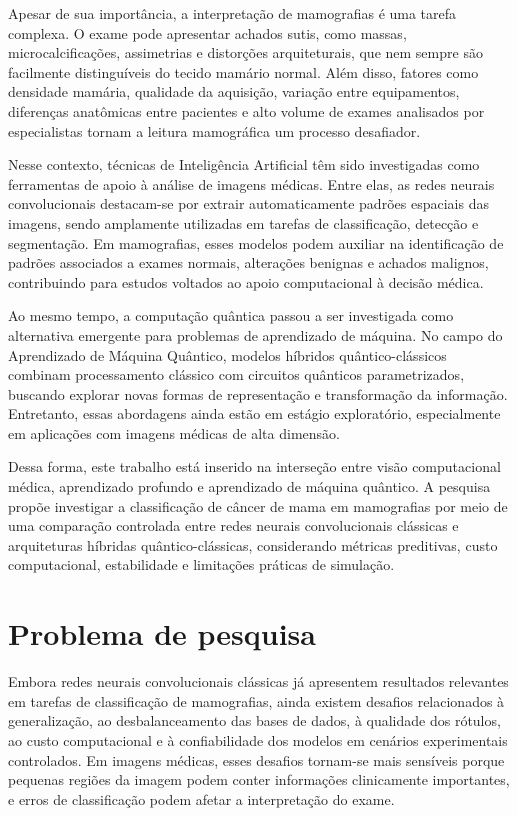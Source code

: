 \documentclass[
    12pt,
    openright,
    oneside,
    a4paper,
    english,
    brazil
]{abntex2}
\begin{document}
Apesar de sua importância, a interpretação de mamografias é uma tarefa complexa. O exame pode apresentar achados sutis, como massas, microcalcificações, assimetrias e distorções arquiteturais, que nem sempre são facilmente distinguíveis do tecido mamário normal. Além disso, fatores como densidade mamária, qualidade da aquisição, variação entre equipamentos, diferenças anatômicas entre pacientes e alto volume de exames analisados por especialistas tornam a leitura mamográfica um processo desafiador.

Nesse contexto, técnicas de Inteligência Artificial têm sido investigadas como ferramentas de apoio à análise de imagens médicas. Entre elas, as redes neurais convolucionais destacam-se por extrair automaticamente padrões espaciais das imagens, sendo amplamente utilizadas em tarefas de classificação, detecção e segmentação. Em mamografias, esses modelos podem auxiliar na identificação de padrões associados a exames normais, alterações benignas e achados malignos, contribuindo para estudos voltados ao apoio computacional à decisão médica.

Ao mesmo tempo, a computação quântica passou a ser investigada como alternativa emergente para problemas de aprendizado de máquina. No campo do Aprendizado de Máquina Quântico, modelos híbridos quântico-clássicos combinam processamento clássico com circuitos quânticos parametrizados, buscando explorar novas formas de representação e transformação da informação. Entretanto, essas abordagens ainda estão em estágio exploratório, especialmente em aplicações com imagens médicas de alta dimensão.

Dessa forma, este trabalho está inserido na interseção entre visão computacional médica, aprendizado profundo e aprendizado de máquina quântico. A pesquisa propõe investigar a classificação de câncer de mama em mamografias por meio de uma comparação controlada entre redes neurais convolucionais clássicas e arquiteturas híbridas quântico-clássicas, considerando métricas preditivas, custo computacional, estabilidade e limitações práticas de simulação.


\section{Problema de pesquisa}

Embora redes neurais convolucionais clássicas já apresentem resultados relevantes em tarefas de classificação de mamografias, ainda existem desafios relacionados à generalização, ao desbalanceamento das bases de dados, à qualidade dos rótulos, ao custo computacional e à confiabilidade dos modelos em cenários experimentais controlados. Em imagens médicas, esses desafios tornam-se mais sensíveis porque pequenas regiões da imagem podem conter informações clinicamente importantes, e erros de classificação podem afetar a interpretação do exame.
\end{document}
